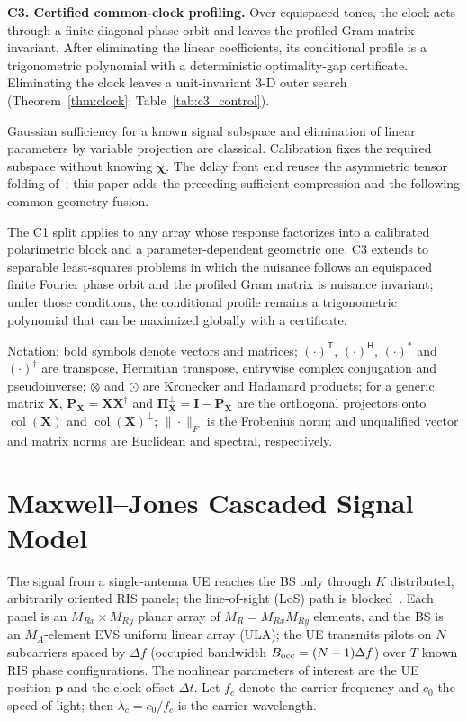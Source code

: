 \documentclass[letterpaper,journal]{IEEEtran}
\newcommand{\bp}{\mathbf{p}}
\newcommand{\bI}{\mathbf{I}}
\newcommand{\bP}{\mathbf{P}}
\newcommand{\bX}{\mathbf{X}}
\newcommand{\bPi}{\boldsymbol{\Pi}}
\newcommand{\bchi}{\boldsymbol{\chi}}
\newcommand{\coll}{\operatorname{col}}
\begin{document}
\textbf{C3. Certified common-clock profiling.} Over equispaced tones, the
clock acts through a finite diagonal phase orbit and leaves the profiled Gram
matrix invariant. After eliminating the linear coefficients, its conditional
profile is a trigonometric polynomial with a deterministic optimality-gap
certificate. Eliminating the clock leaves a unit-invariant 3-D outer search
(Theorem~\ref{thm:clock}; Table~\ref{tab:c3_control}).

Gaussian sufficiency for a known signal subspace and elimination of linear
parameters by variable projection are classical. Calibration fixes the
required subspace without knowing $\bchi$. The delay front end reuses the
asymmetric tensor folding of~\cite{gong2026aimdf}; this paper adds the
preceding sufficient compression and the following common-geometry fusion.

The C1 split applies to any array whose response factorizes into a
calibrated polarimetric block and a parameter-dependent geometric one. C3
extends to separable least-squares problems in which the nuisance follows an
equispaced finite Fourier phase orbit and the profiled Gram matrix is nuisance
invariant; under those conditions, the conditional profile remains a
trigonometric polynomial that can be maximized globally with a certificate.

Notation: bold symbols denote vectors and matrices; $(\cdot)^{\mathsf T}$,
$(\cdot)^{\mathsf H}$, $(\cdot)^{\ast}$ and $(\cdot)^{\dagger}$ are transpose,
Hermitian transpose, entrywise complex conjugation and pseudoinverse;
$\otimes$ and $\odot$ are Kronecker and
Hadamard products; for a generic matrix $\bX$, $\bP_{\bX}=\bX\bX^{\dagger}$
and $\bPi_{\bX}^{\perp}=\bI-\bP_{\bX}$ are the orthogonal projectors onto
$\coll(\bX)$ and $\coll(\bX)^{\perp}$; $\|\cdot\|_F$ is the Frobenius norm;
and unqualified vector and matrix norms are Euclidean and spectral,
respectively.

\section{Maxwell--Jones Cascaded Signal Model}
\label{sec:system_model}

The signal from a single-antenna UE reaches the BS only through $K$
distributed, arbitrarily oriented RIS panels; the line-of-sight (LoS) path is
blocked~\cite{fascista2022rissync,zhao2021timing}. Each panel is an
$M_{Rx}\times M_{Ry}$ planar array of $M_R=M_{Rx}M_{Ry}$ elements, and the BS
is an $M_A$-element EVS uniform linear array (ULA); the UE transmits pilots on
$N$ subcarriers spaced by $\Delta f$ (occupied bandwidth
$B_{\rm occ}=(N-1)\Delta f$) over $T$ known RIS phase configurations. The nonlinear parameters of interest are the
UE position $\bp$ and the clock offset $\Delta t$. Let $f_c$ denote the
carrier frequency and $c_0$ the speed of light; then $\lambda_c=c_0/f_c$
is the carrier wavelength.
\end{document}
